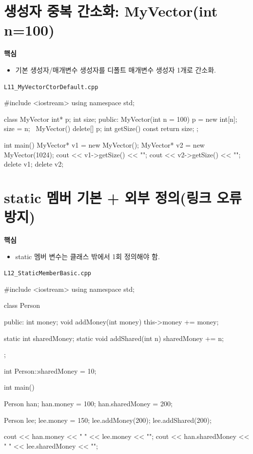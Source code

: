 \documentclass[11pt,a4paper]{article}
\newcommand{\filetag}[1]{\texttt{\color{Accent}#1}}
\begin{document}
\section{생성자 중복 간소화: MyVector(int n=100)}
\begin{GoalBox}
\textbf{핵심}
\begin{itemize}[leftmargin=18pt]
  \item 기본 생성자/매개변수 생성자를 디폴트 매개변수 생성자 1개로 간소화.
\end{itemize}
\end{GoalBox}

\noindent\filetag{L11\_MyVectorCtorDefault.cpp}
\begin{cppcode}
#include <iostream>
using namespace std;

class MyVector {
    int* p;
    int size;
public:
    MyVector(int n = 100) {
        p = new int[n];
        size = n;
    }
    ~MyVector() { delete[] p; }
    int getSize() const { return size; }
};

int main() {
    MyVector* v1 = new MyVector();
    MyVector* v2 = new MyVector(1024);
    cout << v1->getSize() << "\n";
    cout << v2->getSize() << "\n";
    delete v1;
    delete v2;
}
\end{cppcode}

\section{static 멤버 기본 + 외부 정의(링크 오류 방지)}
\begin{GoalBox}
\textbf{핵심}
\begin{itemize}[leftmargin=18pt]
  \item static 멤버 변수는 클래스 밖에서 1회 정의해야 함.
\end{itemize}
\end{GoalBox}

\noindent\filetag{L12\_StaticMemberBasic.cpp}
\begin{cppcode}
#include <iostream>
using namespace std;

class Person {
public:
    int money;
    void addMoney(int money) { this->money += money; }

    static int sharedMoney;
    static void addShared(int n) { sharedMoney += n; }
};

int Person::sharedMoney = 10;

int main() {
    Person han;
    han.money = 100;
    han.sharedMoney = 200;

    Person lee;
    lee.money = 150;
    lee.addMoney(200);
    lee.addShared(200);

    cout << han.money << " " << lee.money << "\n";
    cout << han.sharedMoney << " " << lee.sharedMoney << "\n";
}
\end{cppcode}
\end{document}
